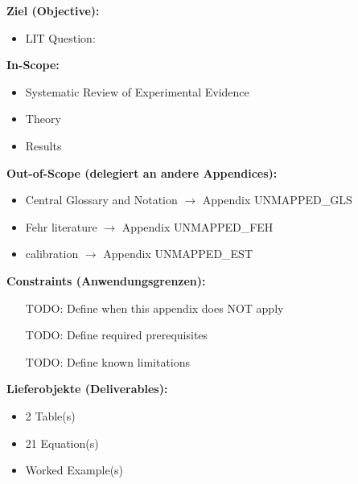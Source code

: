 

\begin{tcolorbox}[
    colback=orange!5!white,
    colframe=orange!75!black,
    title={\textbf{Appendix Scope: Ziel / In-Scope / Out-of-Scope / Constraints}},
    fonttitle=\bfseries
]

\textbf{Ziel (Objective):}
\begin{itemize}[nosep]
    \item LIT Question:
\end{itemize}

\textbf{In-Scope:}
\begin{itemize}[nosep]
    \item Systematic Review of Experimental Evidence
    \item Theory
    \item Results
\end{itemize}

\textbf{Out-of-Scope (delegiert an andere Appendices):}
\begin{itemize}[nosep]
    \item Central Glossary and Notation $\rightarrow$ Appendix UNMAPPED_GLS
    \item Fehr literature $\rightarrow$ Appendix UNMAPPED_FEH
    \item calibration $\rightarrow$ Appendix UNMAPPED_EST
\end{itemize}

\textbf{Constraints (Anwendungsgrenzen):}
\begin{itemize}[nosep]
    \item [TODO: Define when this appendix does NOT apply]
    \item [TODO: Define required prerequisites]
    \item [TODO: Define known limitations]
\end{itemize}

\textbf{Lieferobjekte (Deliverables):}
\begin{itemize}[nosep]
    \item 2 Table(s)
    \item 21 Equation(s)
    \item Worked Example(s)
\end{itemize}

\end{tcolorbox}



